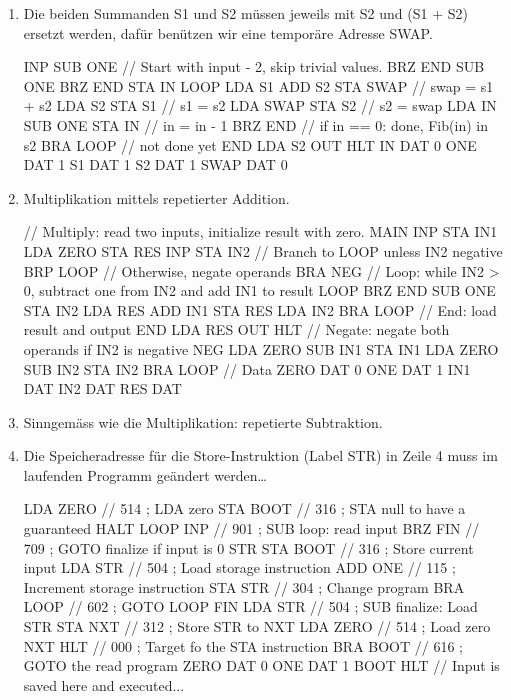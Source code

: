 \begin{solution}
\begin{enumerate}[label=\alph*)]
		\item Die beiden Summanden S1 und S2 müssen jeweils mit S2 und (S1 + S2) ersetzt werden, dafür benützen wir eine temporäre Adresse SWAP.
			\begin{assembly}
				INP
				SUB ONE  // Start with input - 2, skip trivial values.
				BRZ END
				SUB ONE
				BRZ END
				STA IN
		LOOP    LDA S1
				ADD S2
				STA SWAP  // swap = s1 + s2
				LDA S2
				STA S1    // s1 = s2
				LDA SWAP
				STA S2    // s2 = swap
				LDA IN
				SUB ONE
				STA IN    // in = in - 1
				BRZ END   // if in == 0: done, Fib(in) in s2
				BRA LOOP  // not done yet
		END     LDA S2
				OUT
				HLT 
		IN      DAT 0
		ONE     DAT 1
		S1      DAT 1
		S2      DAT 1
		SWAP    DAT 0						
			\end{assembly}
        \item Multiplikation mittels repetierter Addition.
			\begin{assembly}
// Multiply: read two inputs, initialize result with zero.
MAIN INP
	STA IN1
	LDA ZERO
	STA RES
	INP
	STA IN2
// Branch to LOOP unless IN2 negative
	BRP LOOP
// Otherwise, negate operands
	BRA NEG
// Loop: while IN2 > 0, subtract one from IN2 and add IN1 to result
LOOP BRZ END
	SUB ONE
	STA IN2
	LDA RES
	ADD IN1
	STA RES
	LDA IN2
	BRA LOOP
// End: load result and output
END LDA RES
	OUT
    HLT
// Negate: negate both operands if IN2 is negative
NEG LDA ZERO
	SUB IN1
	STA IN1
	LDA ZERO
	SUB IN2
	STA IN2
	BRA LOOP
// Data
ZERO DAT 0
ONE DAT 1
IN1 DAT
IN2 DAT
RES DAT
           \end{assembly}
	   \item Sinngemäss wie die Multiplikation: repetierte Subtraktion.
	   \item Die Speicheradresse für die Store-Instruktion (Label STR) in Zeile 4 muss im laufenden Programm geändert werden\dots
\begin{assembly}
	 LDA ZERO  // 514  ; LDA zero
	 STA BOOT  // 316  ; STA null to have a guaranteed HALT
LOOP INP       // 901  ; SUB loop: read input
	 BRZ FIN   // 709  ; GOTO finalize if input is 0
STR  STA BOOT  // 316  ; Store current input
	 LDA STR   // 504  ; Load storage instruction
	 ADD ONE   // 115  ; Increment storage instruction
	 STA STR   // 304  ; Change program
	 BRA LOOP  // 602  ; GOTO LOOP
FIN  LDA STR   // 504  ; SUB finalize: Load STR
	 STA NXT   // 312  ; Store STR to NXT
	 LDA ZERO  // 514  ; Load zero
NXT  HLT       // 000  ; Target fo the STA instruction
	 BRA BOOT  // 616  ; GOTO the read program
ZERO DAT 0
ONE  DAT 1
BOOT HLT       // Input is saved here and executed...
		\end{assembly}			
    \end{enumerate}
\end{solution}

